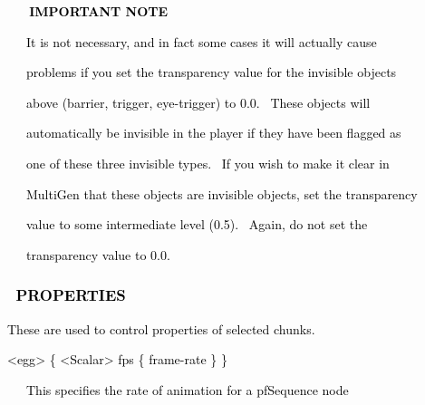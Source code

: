 \documentclass[a4paper]{article}
\newcommand\textstyleOOoComputerKeyWord[1]{\textrm{\textcolor[rgb]{0.0,0.0,0.5019608}{#1}}}
\begin{document}
\bigskip

{\bfseries
\hypertarget{RefHeading7920869075401}{}\textstyleOOoComputerKeyWord{\textcolor{black}{\ \ \ IMPORTANT NOTE}}}


\bigskip

{\color{black}
\textstyleOOoComputerKeyWord{\textcolor{black}{\ \ \ It is not necessary, and in fact some cases it will actually
cause}}}

{\color{black}
\textstyleOOoComputerKeyWord{\textcolor{black}{\ \ \ problems if you set the transparency value for the invisible
objects}}}

{\color{black}
\textstyleOOoComputerKeyWord{\textcolor{black}{\ \ \ above (barrier, trigger, eye-trigger) to 0.0. \ These objects
will}}}

{\color{black}
\textstyleOOoComputerKeyWord{\textcolor{black}{\ \ \ automatically be invisible in the player if they have been flagged
as}}}

{\color{black}
\textstyleOOoComputerKeyWord{\textcolor{black}{\ \ \ one of these three invisible types. \ If you wish to make it clear
in}}}

{\color{black}
\textstyleOOoComputerKeyWord{\textcolor{black}{\ \ \ MultiGen that these objects are invisible objects, set the
transparency}}}

{\color{black}
\textstyleOOoComputerKeyWord{\textcolor{black}{\ \ \ value to some intermediate level (0.5). \ Again, do not set the}}}

{\color{black}
\textstyleOOoComputerKeyWord{\textcolor{black}{\ \ \ transparency value to 0.0.}}}

\subsubsection[\ PROPERTIES ]{\textstyleOOoComputerKeyWord{\textcolor{black}{\ PROPERTIES }}}
\hypertarget{RefHeading7922869075401}{}
\bigskip

{\color{black}
\textstyleOOoComputerKeyWord{\textcolor{black}{These are used to control properties of selected chunks. }}}


\bigskip

{\color{black}
\textstyleOOoComputerKeyWord{\textcolor{black}{{\textless}egg{\textgreater} \{ {\textless}Scalar{\textgreater} fps \{
frame-rate \} \}}}}


\bigskip

{\color{black}
\textstyleOOoComputerKeyWord{\textcolor{black}{\ \ \ This specifies the rate of animation for a pfSequence node}}}
\end{document}
